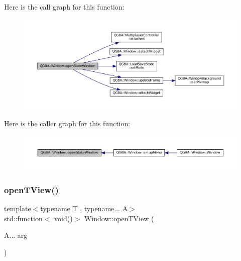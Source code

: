 Here is the call graph for this function\+:
\nopagebreak
\begin{figure}[H]
\begin{center}
\leavevmode
\includegraphics[width=350pt]{class_q_g_b_a_1_1_window_a830974740cbfbd017c09eeb45df41c04_cgraph}
\end{center}
\end{figure}
Here is the caller graph for this function\+:
\nopagebreak
\begin{figure}[H]
\begin{center}
\leavevmode
\includegraphics[width=350pt]{class_q_g_b_a_1_1_window_a830974740cbfbd017c09eeb45df41c04_icgraph}
\end{center}
\end{figure}
\mbox{\label{class_q_g_b_a_1_1_window_ab4bbc62ad6d07c39fab46adbc81086e5}} 
\subsubsection{\texorpdfstring{open\+T\+View()}{openTView()}}
{\footnotesize\ttfamily template$<$typename T , typename... A$>$ \\
std\+::function$<$ void()$>$ Window\+::open\+T\+View (\begin{DoxyParamCaption}\item[{A...}]{arg }\end{DoxyParamCaption})\hspace{0.3cm}{\ttfamily [private]}}

